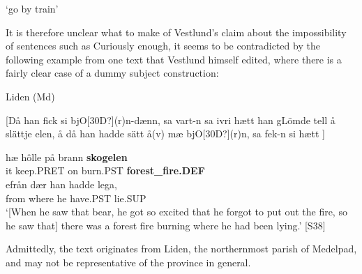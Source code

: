 \glt ‘go by train’

\z

It is therefore unclear what to make of Vestlund’s claim about the impossibility of sentences such as Curiously enough, it seems to be contradicted by the following example from one text that Vestlund himself edited, where there is a fairly clear case of a dummy subject construction:


\item 

Liden (Md)



[Då han fick si bjO[30D?](r)n{}-dænn, sa vart-n sa ivri hætt han gLömde tell å slättje elen, å då han hadde sätt å(v) mæ bjO[30D?](r)n, sa fek-n si hætt ]


 \ea\label{}
\gll hæ  hôlle  på  brann  \textbf{skogelen}\\


it  keep.PRET  on  burn.PST  \textbf{forest\_fire.DEF}\\

 \ea\label{}
\gll efrån  dær  han  hadde  lega,\\


from  where  he   have.PST  lie.SUP\\

\glt  ‘[When he saw that bear, he got so excited that he forgot to put out the fire, so he saw that] there was a forest fire burning where he had been lying.’ [S38]

\z

Admittedly, the text originates from Liden, the northernmost parish of Medelpad, and may not be representative of the province in general. 


